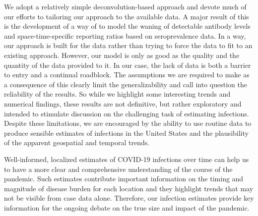 \documentclass{article}
\begin{document}
We adopt a relatively simple deconvolution-based approach and devote
much of our efforts to tailoring our approach to the available data. A major
result of this is the development of a way of to model the waning of detectable
antibody levels and space-time-specific reporting ratios based on seroprevalence
data. In a way, our approach is built for the data rather than trying to force
the data to fit to an existing approach. However, our model is only as good as
the quality and the quantity of the data provided to it. In our case, the lack
of data is both a barrier to entry and a continual roadblock. The assumptions we
are required to make as a consequence of this clearly limit the generalizability
and call into question the reliability of the results. So while we highlight
some interesting trends and numerical findings, these results are not
definitive, but rather exploratory and intended to stimulate discussion on the
challenging task of estimating infections. Despite these limitations, we are
encouraged by the ability to use routine data to produce sensible estimates of
infections in the United States and the plausibility of the apparent geospatial
and temporal trends. 
 




Well-informed, localized estimates of COVID-19 infections over time can help us
to have a more clear and comprehensive understanding of the course of the
pandemic. Such estimates contribute important information on the timing and
magnitude of disease burden for each location and they highlight trends that may
not be visible from case data alone. Therefore, our infection estimates provide
key information for the ongoing debate on the true size and impact of the
pandemic.
\end{document}
